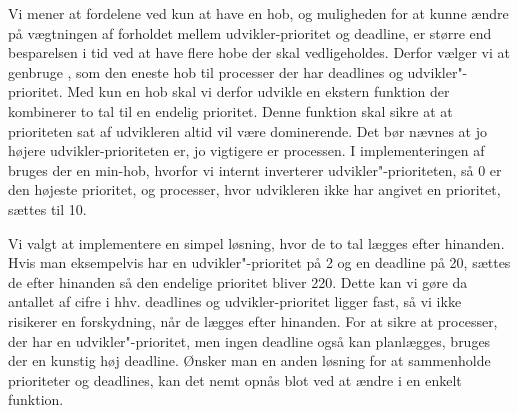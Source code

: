 Vi mener at fordelene ved kun at have en hob, og muligheden for at kunne ændre på vægtningen af forholdet mellem udvikler-prioritet og deadline, er større end besparelsen i tid ved at have flere hobe der skal vedligeholdes. Derfor vælger vi  at genbruge , som den eneste hob til  processer der har deadlines og udvikler"-prioritet. Med kun en hob skal vi derfor udvikle en ekstern funktion der kombinerer to tal til en endelig prioritet. Denne funktion skal sikre at at prioriteten sat af udvikleren altid vil være dominerende. Det bør nævnes at jo højere udvikler-prioriteten er, jo vigtigere er processen. I implementeringen af  bruges der en min-hob, hvorfor vi internt inverterer udvikler"-prioriteten, så 0 er den højeste prioritet, og processer, hvor udvikleren ikke har angivet en prioritet, sættes til 10.

Vi valgt at implementere en simpel løsning, hvor  de to tal lægges efter hinanden. Hvis man eksempelvis har en udvikler"-prioritet på 2 og en deadline på 20, sættes de efter hinanden så den endelige prioritet bliver 220. Dette kan vi gøre da antallet af cifre i hhv. deadlines og udvikler-prioritet ligger fast, så vi ikke risikerer en forskydning, når de lægges efter hinanden. For at sikre at processer, der har en udvikler"-prioritet, men ingen deadline også kan planlægges, bruges der en kunstig høj deadline. Ønsker man en anden løsning for at sammenholde prioriteter og deadlines, kan det nemt opnås blot ved at ændre i en enkelt funktion.
    
